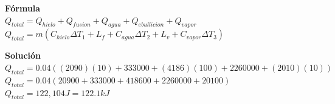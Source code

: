 \documentclass[a4paper, 11pt]{article}
\begin{document}
\begin{enumerate}
{            \textbf{Fórmula} \\
            $Q_{total} = Q_{hielo} + Q_{fusion} + Q_{agua} + Q_{ebullicion} + Q_{vapor}$ \\
            $Q_{total} = m(C_{hielo}\Delta T_1 + L_f + C_{agua}\Delta T_2 + L_v + C_{vapor}\Delta T_3)$ \par

            \textbf{Solución} \\
            $Q_{total} = 0.04( (2090)(10) + 333000 + (4186)(100) + 2260000 + (2010)(10) )$ \\
            $Q_{total} = 0.04(20900 + 333000 + 418600 + 2260000 + 20100)$ \\
            $Q_{total} = 122,104 J = 122.1 kJ$
        }
    \end{enumerate}
\end{document}
